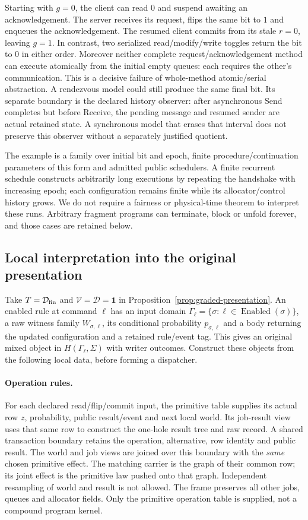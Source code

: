 \documentclass[11pt]{article}
\begin{document}
Starting with $g=0$, the client can read $0$ and suspend awaiting an acknowledgement. The server receives its request, flips the same bit to $1$ and enqueues the acknowledgement. The resumed client commits from its stale $r=0$, leaving $g=1$. In contrast, two serialized read/modify/write toggles return the bit to $0$ in either order. Moreover neither complete request/acknowledgement method can execute atomically from the initial empty queues: each requires the other's communication. This is a decisive failure of whole-method atomic/serial abstraction. A rendezvous model could still produce the same final bit. Its separate boundary is the declared history observer: after asynchronous Send completes but before Receive, the pending message and resumed sender are actual retained state. A synchronous model that erases that interval does not preserve this observer without a separately justified quotient.

The example is a family over initial bit and epoch, finite procedure/continuation parameters of this form and admitted public schedulers. A finite recurrent schedule constructs arbitrarily long executions by repeating the handshake with increasing epoch; each configuration remains finite while its allocator/control history grows. We do not require a fairness or physical-time theorem to interpret these runs. Arbitrary fragment programs can terminate, block or unfold forever, and those cases are retained below.

\subsection{Local interpretation into the original presentation}

Take $T=\mathcal D_{\rm fin}$ and $\mathcal V=\mathcal D=\mathbf1$ in Proposition~\ref{prop:graded-presentation}. An enabled rule at command $\ell$ has an input domain $\Gamma_\ell=\{\sigma:\ell\in\operatorname{Enabled}(\sigma)\}$, a raw witness family $W_{\sigma,\ell}$, its conditional probability $p_{\sigma,\ell}$ and a body returning the updated configuration and a retained rule/event tag. This gives an original mixed object in $H(\Gamma_\ell,\Sigma)$ with writer outcomes. Construct these objects from the following local data, before forming a dispatcher.

\paragraph{Operation rules.} For each declared read/flip/commit input, the primitive table supplies its actual row $z$, probability, public result/event and next local world. Its job-result view uses that same row to construct the one-hole result tree and raw record. A shared transaction boundary retains the operation, alternative, row identity and public result. The world and job views are joined over this boundary with the \emph{same} chosen primitive effect. The matching carrier is the graph of their common row; its joint effect is the primitive law pushed onto that graph. Independent resampling of world and result is not allowed. The frame preserves all other jobs, queues and allocator fields. Only the primitive operation table is supplied, not a compound program kernel.
\end{document}
